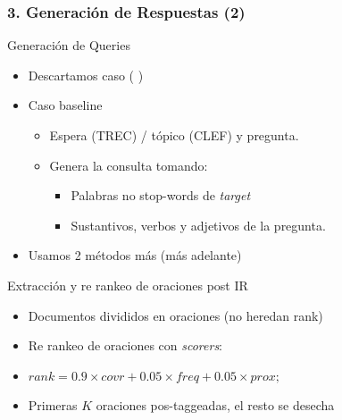 \begin{frame}
\frametitle{3. Generación de Respuestas (2)}
  \begin{block}{Generación de Queries}
  \begin{itemize}
      \item Descartamos caso ( )
      \item Caso baseline
      \begin{itemize}
        \item Espera (TREC) / tópico (CLEF) y pregunta. 
        \item Genera la consulta tomando:
        \begin{itemize}
              \item Palabras no stop-words de \textit{target} 
              \item Sustantivos, verbos y adjetivos de la pregunta.
        \end{itemize}
      \end{itemize}
      \item Usamos 2 métodos más (más adelante)
    \end{itemize}
  \end{block}

    \begin{exampleblock}{Extracción y re rankeo de oraciones post IR}
    \begin{itemize}
      \item Documentos divididos en oraciones (no heredan rank)
      \item Re rankeo de oraciones con \textit{scorers}:
      \item $rank = 0.9\times covr + 0.05\times freq + 0.05\times prox;$ %
      \item Primeras $K$ oraciones pos-taggeadas, el resto se desecha
    \end{itemize}
  \end{exampleblock}
\end{frame}



